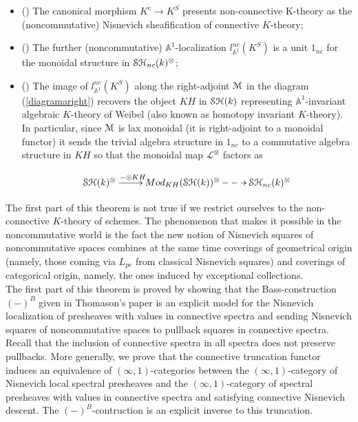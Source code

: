 \begin{refsection}
\begin{thm}
\begin{itemize}
\item (\cite[1.9]{nc2}) The canonical morphism $K^c\to K^S$ presents non-connective K-theory as the (noncommutative) Nisnevich sheafification of connective $K$-theory;
\item (\cite[1.12]{nc2}) The further (noncommutative) $\mathbb{A}^1$-localization $l_{\mathbb{A}^1}^{nc}(K^S)$ is a unit $1_{nc}$ for the monoidal structure in $\mathcal{S}\mathcal{H}_{nc}(k)^{\otimes}$;
\item (\cite[1.11]{nc2}) The image of  $l_{\mathbb{A}^1}^{nc}(K^S)$ along the right-adjoint $\mathcal{M}$ in the diagram (\ref{diagramaright}) recovers the object $KH$ in $\mathcal{S}\mathcal{H}(k)$ representing $\mathbb{A}^1$-invariant algebraic $K$-theory of Weibel (also known as homotopy invariant $K$-theory). In particular, since $\mathcal{M}$ is lax monoidal (it is right-adjoint to a monoidal functor) it sends the trivial algebra structure in $1_{nc}$ to a commutative algebra structure in $KH$ so that the monoidal map $\mathcal{L}^{\otimes}$ factors as

$$
\xymatrix{\stmonoidalk\ar[r]^(0.4){-\otimes KH} &Mod_{KH}(\stk)^{\otimes}\ar@{-->}[r]& \stncmonoidalk}
$$

\end{itemize}
\end{thm}

The first part of this theorem is not true if we restrict ourselves to the non-connective $K$-theory of schemes. The phenomenon that makes it possible in the noncommutative world is the fact the new notion of Nisnevich squares of noncommutative spaces combines at the same time coverings of geometrical origin (namely, those coming via $L_{pe}$ from classical Nisnevich squares) and coverings of categorical origin, namely, the ones induced by exceptional collections. \\

The first part of this theorem is proved by showing that the Bass-construction $(-)^B$ given in Thomason's paper \cite{thomasonalgebraic} is an explicit model for the Nisnevich localization of presheaves with values in connective spectra and sending Nisnevich squares of noncommutative spaces to pullback squares in connective spectra. Recall that the inclusion of connective spectra in all spectra does not preserve pullbacks. More generally, we prove that the connective truncation functor induces an equivalence of $(\infty,1)$-categories between the $(\infty,1)$-category of Nisnevich local spectral presheaves and the $(\infty,1)$-category of spectral presheaves with values in connective spectra and satisfying connective Nisnevich descent. The $(-)^B$-contruction is an explicit inverse to this truncation.\\



\end{refsection}
